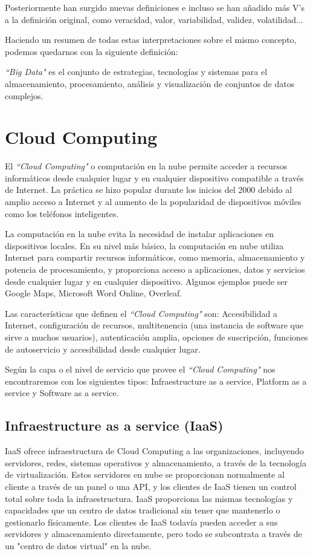 Posteriormente han surgido nuevas definiciones e incluso se han añadido más V’s a la definición original, como veracidad, valor, variabilidad, validez, volatilidad... 

Haciendo un resumen de todas estas interpretaciones sobre el mismo concepto, podemos quedarnos con la siguiente definición\cite{casas}: 

\textit{``Big Data"} es el conjunto de estrategias, tecnologías y sistemas para el almacenamiento, procesamiento, análisis y visualización de conjuntos de datos complejos.

\section{Cloud Computing}

El \textit{``Cloud Computing"}\cite{erl}\cite{skemp} o computación en la nube permite acceder a recursos informáticos desde cualquier lugar y en cualquier dispositivo compatible a través de Internet. La práctica se hizo popular durante los inicios del 2000 debido al amplio acceso a Internet y al aumento de la popularidad de dispositivos móviles como los teléfonos inteligentes. 

La computación en la nube evita la necesidad de instalar aplicaciones en dispositivos locales. En su nivel más básico, la computación en nube utiliza Internet para compartir recursos informáticos, como memoria, almacenamiento y potencia de procesamiento, y proporciona acceso a aplicaciones, datos y servicios desde cualquier lugar y en cualquier dispositivo. Algunos ejemplos puede ser Google Maps, Microsoft Word Online, Overleaf.

Las características que definen el \textit{``Cloud Computing"} son: Accesibilidad a Internet, configuración de recursos, multitenencia (una instancia de software que sirve a muchos usuarios), autenticación amplia, opciones de suscripción, funciones de autoservicio y accesibilidad desde cualquier lugar. 

Según la capa o el nivel de servicio que provee el \textit{``Cloud Computing"} nos encontraremos con los siguientes tipos: Infraestructure as a service, Platform as a service y Software as a service.

\subsection{Infraestructure as a service (IaaS)}

IaaS ofrece infraestructura de Cloud Computing a las organizaciones, incluyendo servidores, redes, sistemas operativos y almacenamiento, a través de la tecnología de virtualización. Estos servidores en nube se proporcionan normalmente al cliente a través de un panel o una API, y los clientes de IaaS tienen un control total sobre toda la infraestructura. IaaS proporciona las mismas tecnologías y capacidades que un centro de datos tradicional sin tener que mantenerlo o gestionarlo físicamente. Los clientes de IaaS todavía pueden acceder a sus servidores y almacenamiento directamente, pero todo se subcontrata a través de un "centro de datos virtual" en la nube. 

